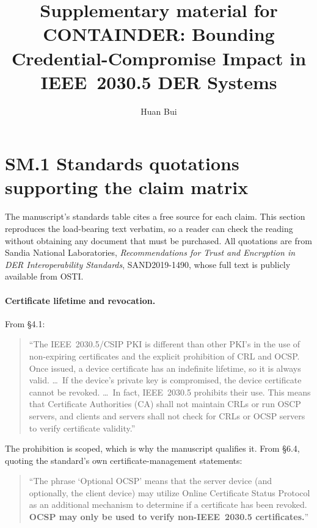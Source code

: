\documentclass[review]{elsarticle}
\begin{document}
\begin{frontmatter}
\title{Supplementary material for\\
CONTAINDER: Bounding Credential-Compromise Impact in IEEE~2030.5 DER Systems}
\author{Huan Bui}
\end{frontmatter}

\section*{SM.1 Standards quotations supporting the claim matrix}

The manuscript's standards table cites a free source for each claim. This section reproduces the
load-bearing text verbatim, so a reader can check the reading without obtaining any document that
must be purchased. All quotations are from Sandia National Laboratories, \emph{Recommendations for
Trust and Encryption in DER Interoperability Standards}, SAND2019-1490, whose full text is
publicly available from OSTI.

\paragraph{Certificate lifetime and revocation.} From \S4.1:

\begin{quote}
``The IEEE~2030.5/CSIP PKI is different than other PKI's in the use of non-expiring certificates
and the explicit prohibition of CRL and OCSP. Once issued, a device certificate has an indefinite
lifetime, so it is always valid. \dots\ If the device's private key is compromised, the device
certificate cannot be revoked. \dots\ In fact, IEEE~2030.5 prohibits their use. This means that
Certificate Authorities (CA) shall not maintain CRLs or run OSCP servers, and clients and servers
shall not check for CRLs or OCSP servers to verify certificate validity.''
\end{quote}

The prohibition is scoped, which is why the manuscript qualifies it. From \S6.4, quoting the
standard's own certificate-management statements:

\begin{quote}
``The phrase `Optional OCSP' means that the server device (and optionally, the client device) may
utilize Online Certificate Status Protocol as an additional mechanism to determine if a
certificate has been revoked. \textbf{OCSP may only be used to verify non-IEEE~2030.5
certificates.}''
\end{quote}
\end{document}
